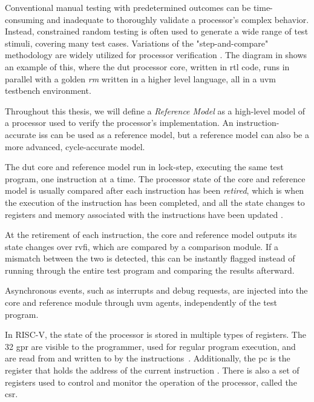 Conventional manual testing with predetermined outcomes can be time\--consuming and inadequate to thoroughly validate a processor's complex behavior. Instead, constrained random testing is often used to generate a wide range of test stimuli, covering many test cases. Variations of the "step-and-compare" methodology are widely utilized for processor verification \cite{taylorAdvancedRISCVVerification2023}. The diagram in  shows an example of this, where the \acrfull{dut} processor core, written in \acrfull{rtl} code, runs in parallel with a golden \textit{\gls{rm}} written in a higher level language, all in a \acrfull{uvm} testbench environment. 

Throughout this thesis, we will define a \textit{Reference Model} as a high-level model of a processor used to verify the processor's implementation. An instruction\--accurate \acrfull{iss} can be used as a reference model, but a reference model can also be a more advanced, cycle-accurate model. 

The \acrshort{dut} core and reference model run in lock-step, executing the same test program, one instruction at a time. 
The processor state of the core and reference model is usually compared after each instruction has been \textit{retired}, which is when the execution of the instruction has been completed, and all the state changes to registers and memory associated with the instructions have been updated \cite{taylorAdvancedRISCVVerification2023}. 

At the retirement of each instruction, the core and reference model outputs its state changes over \acrfull{rvfi}, which are compared by a comparison module. If a mismatch between the two is detected, this can be instantly flagged instead of running through the entire test program and comparing the results afterward. 

Asynchronous events, such as interrupts and debug requests, are injected into the core and reference module through \acrshort{uvm} agents, independently of the test program.

In RISC-V, the state of the processor is stored in multiple types of registers. The 32 \acrfull{gpr} are visible to the programmer, used for regular program execution, and are read from and written to by the instructions~\cite{watermanRISCVInstructionSet2019}. Additionally, the \acrfull{pc} is the register that holds the address of the current instruction \cite{watermanRISCVInstructionSet2019}. There is also a set of registers used to control and monitor the operation of the processor, called the \acrfull{csr}. 

